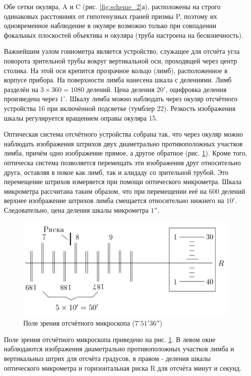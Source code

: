 	Обе сетки окуляра, A и C (рис. \ref{fig:scheme_2}а), расположены на строго одинаковых расстояниях от гипотенузных граней призмы P, поэтому их одновременное наблюдение в окуляре возможно только при совпадении фокальных плоскостей объектива и окуляра (труба настроена на бесконечность).
	
	Важнейшим узлом гониометра является устройство, служащее для отсчёта угла поворота зрительной трубы вокруг вертикальной оси, проходящей через центр столика. На этой оси крепится прозрачное кольцо (лимб), расположенное в корпусе прибора. На поверхности лимба нанесена шкала с делениями. Лимб разделён на $3\times 360 = 1080$ делений. Цена деления $20'$, оцифровка деления произведена через $1^{\circ}$. Шкалу лимба можно наблюдать через окуляр отсчётного устройства 16 при включённой подсветке (тумблер 22). Резкость изображения шкалы регулируется вращением оправы окуляра 15.
	
	Оптическая система отсчётного устройства собрана так, что через окуляр можно наблюдать изображения штрихов двух диаметрально противоположных участков лимба, причём одно изображение прямое, а другое обратное (рис. \ref{fig:scheme_3}). Кроме того, оптическа система позволяется перемещать эти изображения друг относительно друга, оставляя в покое как лимб, так и алидаду со зрительной трубой. Это перемещение штрихов измеряется при помощи оптического микрометра. Шкала микрометра рассчитана таким образом, что при перемещении ееё на 600 делений верхнее изображение штрихов лимба смещается относительно нижнего на $10'$. Следовательно, цена деления шкалы микрометра $1''$.
	
	\begin{figure}
		\includegraphics[scale=0.8]{images/scheme_3.png}
		\caption{Поле зрения отсчётного микроскопа ($7^{\circ}51'36''$)}
		\label{fig:scheme_3}
	\end{figure}
	
	Поле зрения отсчётного микроскопа приведено на рис. \ref{fig:scheme_3}. В левом окне наблюдаются изображения диаметрально противоположных участков лимба и вертикальныз штрих для отсчёта градусов, в правом - деления шкалы оптического микрометра и горизонтальная риска R для отсчёта минут и секунд.
	
